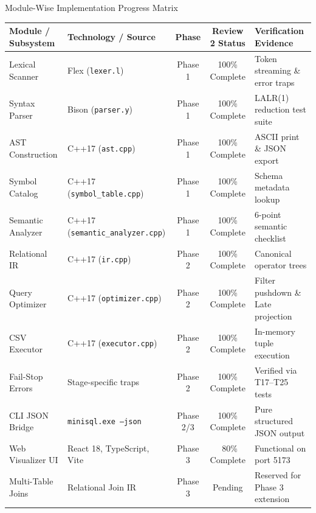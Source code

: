 \documentclass[aspectratio=169,10pt]{beamer}
\begin{document}
\begin{frame}{Module-Wise Implementation Progress Matrix}
    \begin{table}\footnotesize
    \begin{tabularx}{\textwidth}{l p{3.2cm} c c X}
        \toprule
        \textbf{Module / Subsystem} & \textbf{Technology / Source} & \textbf{Phase} & \textbf{Review 2 Status} & \textbf{Verification Evidence} \\
        \midrule
        Lexical Scanner & Flex (\texttt{lexer.l}) & Phase 1 & 100\% Complete & Token streaming \& error traps \\
        Syntax Parser & Bison (\texttt{parser.y}) & Phase 1 & 100\% Complete & LALR(1) reduction test suite \\
        AST Construction & C++17 (\texttt{ast.cpp}) & Phase 1 & 100\% Complete & ASCII print \& JSON export \\
        Symbol Catalog & C++17 (\texttt{symbol\_table.cpp}) & Phase 1 & 100\% Complete & Schema metadata lookup \\
        Semantic Analyzer & C++17 (\texttt{semantic\_analyzer.cpp}) & Phase 1 & 100\% Complete & 6-point semantic checklist \\
        Relational IR & C++17 (\texttt{ir.cpp}) & Phase 2 & 100\% Complete & Canonical operator trees \\
        Query Optimizer & C++17 (\texttt{optimizer.cpp}) & Phase 2 & 100\% Complete & Filter pushdown \& Late projection \\
        CSV Executor & C++17 (\texttt{executor.cpp}) & Phase 2 & 100\% Complete & In-memory tuple execution \\
        Fail-Stop Errors & Stage-specific traps & Phase 2 & 100\% Complete & Verified via T17--T25 tests \\
        CLI JSON Bridge & \texttt{minisql.exe --json} & Phase 2/3 & 100\% Complete & Pure structured JSON output \\
        Web Visualizer UI & React 18, TypeScript, Vite & Phase 3 & ~80\% Complete & Functional on port 5173 \\
        Multi-Table Joins & Relational Join IR & Phase 3 & Pending & Reserved for Phase 3 extension \\
        \bottomrule
    \end{tabularx}
    \end{table}
\end{frame}
\end{document}
